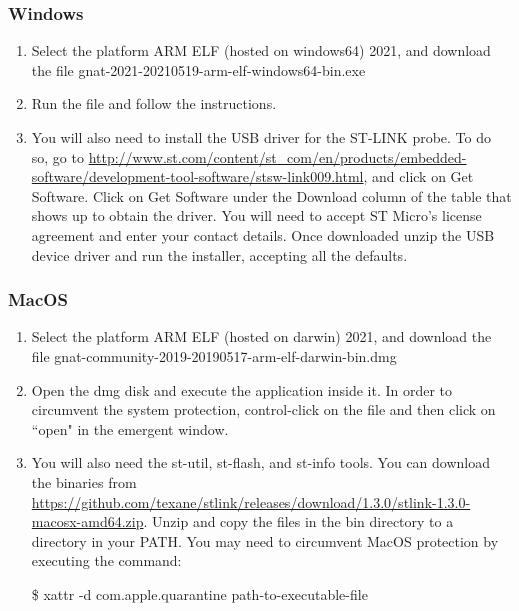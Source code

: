 \subsubsection*{Windows}
\begin{enumerate}
	\item Select the platform ARM ELF (hosted on windows64) 2021, and download the file
	gnat-2021-20210519-arm-elf-windows64-bin.exe
	\item Run the file and follow the instructions.
	\item You will also need to install the USB driver for the ST-LINK probe. To do so, go to \url{http://www.st.com/content/st\_com/en/products/embedded-software/development-tool-software/stsw-link009.html}, and click on Get Software. Click on Get Software under the Download column of the table that shows up to obtain the driver. You will need to accept ST Micro’s license agreement and enter your contact details. 
	Once downloaded unzip the USB device driver and run the installer, accepting all the defaults.
\end{enumerate}
\subsubsection*{MacOS}
\begin{enumerate}
	\item Select the platform ARM ELF (hosted on darwin) 2021, and download the file gnat-community-2019-20190517-arm-elf-darwin-bin.dmg
	\item Open the dmg disk and execute the application inside it. In order to circumvent the system protection, control-click on the file and then click on ``open" in the emergent window.
	\item You will also need the st-util,  st-flash, and st-info tools. You can download the binaries from 
	\url{https://github.com/texane/stlink/releases/download/1.3.0/stlink-1.3.0-macosx-amd64.zip}. Unzip and copy the files in the bin directory to a directory in your PATH. You may need to circumvent MacOS protection by executing the command:
	
	\$ xattr -d com.apple.quarantine path-to-executable-file
\end{enumerate}
